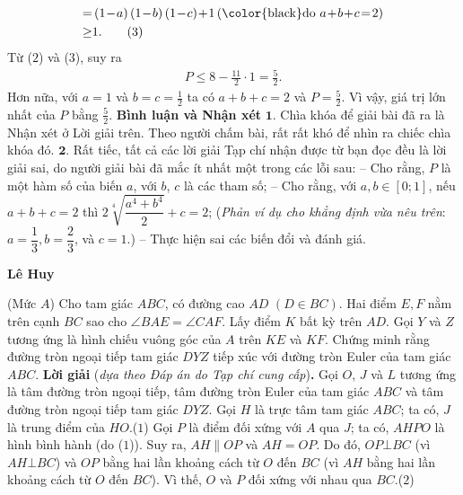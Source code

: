 \begin{multicols}{2}
\begin{align*}
			= &\left( {1 \!-\! a} \right)\left( {1 \!-\! b} \right)\left( {1 \!-\! c} \right) \!+\! 1\left( {{\text{\color{black}do }}a \!+\! b \!+\! c \!=\! 2} \right)\\
			\ge &1. \tag{$3$}
	\end{align*}
	Từ ($2$) và ($3$), suy ra
	\begin{align*}
		P \le 8 - \frac{{11}}{2} \cdot 1 = \frac{5}{2}.
	\end{align*}
	Hơn nữa, với $a = 1$ và $b = c   = \frac{1}{2}$  ta có $a + b + c = 2$ và  $P = \frac{5}{2}$.
	\vskip 0.05cm 
	Vì vậy, giá trị lớn nhất của $P$ bằng $\frac{5}{2}$.
	\vskip 0.05cm  
	\textbf{\color{thachthuctoanhoc}Bình luận và Nhận xét}
	\vskip 0.05cm
	$\pmb{1.}$ Chìa khóa để giải bài đã ra là Nhận xét ở Lời giải trên. Theo người chấm bài, rất rất khó để nhìn ra chiếc chìa khóa đó.
	\vskip 0.05cm
	$\pmb{2.}$ Rất tiếc, tất cả các lời giải Tạp chí nhận được từ bạn đọc đều là lời giải sai, do người giải bài đã mắc ít nhất một trong các \linebreak lỗi sau:
	\vskip 0.05cm
	-- Cho rằng, $P$ là một hàm số của biến $a$, với $b$, $c$ là các tham số;
	\vskip 0.05cm
	-- Cho rằng, với  $a,b \!\in\! [0;1]$, nếu $a \!+\! b \!+\! c \!\!=\!\! 2$ thì  $2\sqrt[4]{{\dfrac{{{a^4} + {b^4}}}{2}}} + c = 2$;
	\vskip 0.05cm
	(\textit{Phản ví dụ cho khẳng định vừa nêu trên}: \linebreak $a = \dfrac{1}{3}, b = \dfrac{2}{3}$, và $c = 1$.)
	\vskip 0.05cm
	-- Thực hiện sai các biến đổi và đánh giá.
	\begin{flushright}
		\textbf{\color{thachthuctoanhoc}Lê Huy}
	\end{flushright}
	{}
	(Mức $A$) Cho tam giác $ABC$, có đường cao $AD$ $(D\in BC)$. Hai điểm $E,F$ nằm trên cạnh $BC$ sao cho $\angle{BAE}=\angle{CAF}$. Lấy điểm $K$ bất kỳ trên $AD$. Gọi $Y$ và $Z$ tương ứng là hình chiếu vuông góc của $A$ trên $KE$ và $KF$. Chứng minh rằng đường tròn ngoại tiếp tam giác $DYZ$ tiếp xúc với đường tròn Euler của tam giác $ABC$.
	\vskip 0.05cm
	\textbf{\color{thachthuctoanhoc}Lời giải} (\textit{dựa theo Đáp án do Tạp chí cung cấp})\textbf{\color{thachthuctoanhoc}.}
	\vskip 0.05cm
	Gọi $O$, $J$ và $L$ tương ứng là tâm đường tròn ngoại tiếp, tâm đường tròn Euler của tam giác $ABC$ và tâm đường tròn ngoại tiếp tam giác $DYZ$.
	\vskip 0.05cm
	Gọi $H$ là trực tâm tam giác $ABC$; ta có, $J$ là trung điểm của $HO$.\hfill       ($1$)
	\vskip 0.05cm
	Gọi $P$ là điểm đối xứng với $A$ qua $J$; ta có, $AHPO$ là hình bình hành (do ($1$)). Suy ra, $AH \parallel OP$ và $AH = OP$. Do đó, $OP \bot BC$ (vì $AH \bot BC$) và $OP$ bằng hai lần khoảng cách từ $O$ đến $BC$ (vì $AH$ bằng hai lần khoảng cách từ $O$ đến $BC$). Vì thế, $O$ và $P$ đối xứng với nhau qua $BC$.\hfill              ($2$)

\end{multicols}
